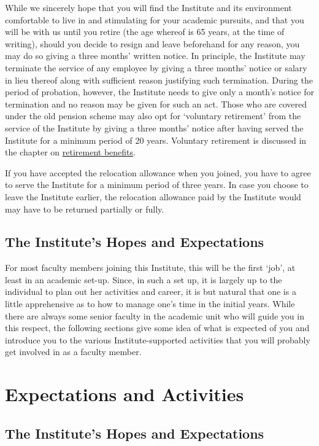 \documentclass[
  10pt,
  a5paper,
  10pt,
  openany]{amsbook}
\begin{document}
While we sincerely hope that you will find the Institute and its
environment comfortable to live in and stimulating for your academic
pursuits, and that you will be with us until you retire (the age whereof
is 65 years, at the time of writing), should you decide to resign and
leave beforehand for any reason, you may do so giving a three months'
written notice. In principle, the Institute may terminate the service of
any employee by giving a three months' notice or salary in lieu thereof
along with sufficient reason justifying such termination. During the
period of probation, however, the Institute needs to give only a month's
notice for termination and no reason may be given for such an act. Those
who are covered under the old pension scheme may also opt for `voluntary
retirement' from the service of the Institute by giving a three months'
notice after having served the Institute for a minimum period of 20
years. Voluntary retirement is discussed in the chapter on
\hyperref[sec:retirement]{retirement benefits}.

If you have accepted the relocation allowance when you joined, you have
to agree to serve the Institute for a minimum period of three years. In
case you choose to leave the Institute earlier, the relocation allowance
paid by the Institute would may have to be returned partially or fully.

\chapter{The Institute's Hopes and
Expectations}\label{the-institutes-hopes-and-expectations}

For most faculty members joining this Institute, this will be the first
`job', at least in an academic set-up. Since, in such a set up, it is
largely up to the individual to plan out her activities and career, it
is but natural that one is a little apprehensive as to how to manage
one's time in the initial years. While there are always some senior
faculty in the academic unit who will guide you in this respect, the
following sections give some idea of what is expected of you and
introduce you to the various Institute-supported activities that you
will probably get involved in as a faculty member.

\part{Expectations and Activities}

\chapter{The Institute's Hopes and
Expectations}\label{the-institutes-hopes-and-expectations-1}
\end{document}
